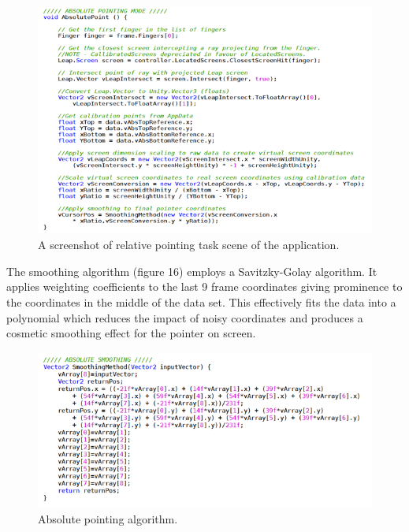 \documentclass{article}
\begin{document}
\begin{figure}[!h]
    \centering
    \includegraphics[width=7.0in]{Figure_14}
    \caption{A screenshot of relative pointing task scene of the application.}
\end{figure}

The smoothing algorithm (figure 16) employs a Savitzky-Golay algorithm. It applies
weighting coefficients to the last 9 frame coordinates giving prominence to the coordinates in the middle of the data set. This effectively fits the data into a polynomial which reduces the impact of noisy coordinates and produces a cosmetic smoothing effect for the pointer on screen.

\begin{figure}[!h]
    \centering
    \includegraphics[width=7.0in]{Figure_15}
    \caption{Absolute pointing algorithm.}
\end{figure}
\end{document}
